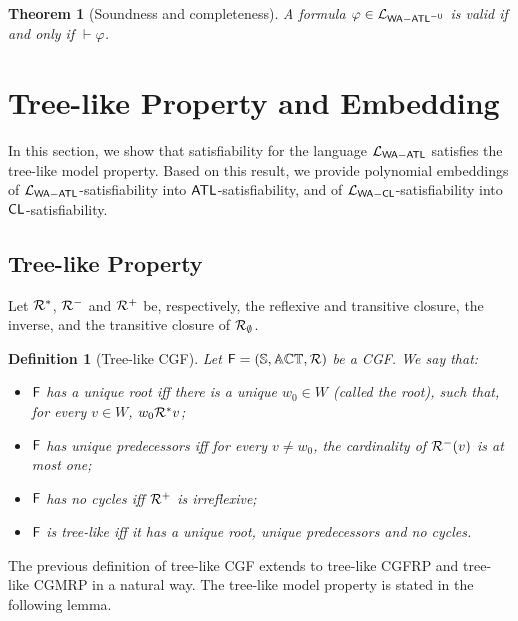 \documentclass{article}
\newtheorem{definition}{Definition}
\newtheorem{theorem}{Theorem}
\begin{document}
\begin{theorem}[Soundness and completeness]
\label{thm:soundness and completeness}
A formula $\varphi \in \mathcal{L}_{\mathsf{WA{-}ATL}^{-\mathsf{U}}}$ is  valid  if and only if $\vdash \varphi$. 
\end{theorem}

\section{Tree-like  Property and Embedding}\label{sec: tree-like model property and embedding}

In this section, we show that satisfiability for the language $\mathcal{L}_{\mathsf{WA{-}ATL}}$ satisfies the tree-like model property. Based on this result, we provide polynomial embeddings of $\mathcal{L}_{\mathsf{WA{-}ATL}}$-satisfiability into $\mathsf{ATL}$-satisfiability, and of $\mathcal{L}_{\mathsf{WA{-}CL}}$-satisfiability into $\mathsf{CL} $-satisfiability.
 

\subsection{Tree-like Property}
Let
 $\mathcal{R}^*$, $\mathcal{R}^-$ and $\mathcal{R}^+$
be, respectively, the reflexive and  transitive closure,
the inverse, and the transitive closure of 
$\mathcal{R}_\emptyset$.
\begin{definition}[Tree-like CGF]\label{def:propertiesCGF}
  Let $\mathsf{F} = (\mathbb{S},  \mathbb{ACT},   \mathcal{R})$
  be a CGF.
  We say that:
  \begin{itemize}
    \item $\mathsf{F}$ has a unique root iff
          there is  a unique $ w_0 \in W$ (called the \emph{root}),
          such that, for every $v \in W$, $w_0 \mathcal{R}_{ }^* v$;
    \item $\mathsf{F}$ has unique predecessors iff
          for every $v \neq w_0 $, the cardinality of $\mathcal{R}_{ }^-( v)$ is at most one;
    \item $\mathsf{F}$ has no cycles iff $\mathcal{R}_{ }^+$ is irreflexive;
    
    \item $\mathsf{F}$ is tree-like iff  it has a unique root,
 unique predecessors and no cycles.    
  \end{itemize}
\end{definition}
The previous definition
of tree-like CGF extends
to tree-like CGFRP
and tree-like CGMRP in a natural way.  
The tree-like model property is stated in the following lemma. 
\end{document}
